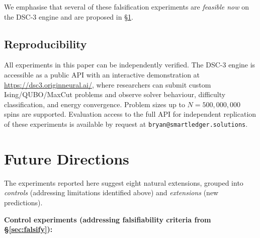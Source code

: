 \documentclass[11pt,a4paper]{article}
\begin{document}
\noindent We emphasise that several of these falsification experiments are \emph{feasible now} on the DSC-3 engine and are proposed in \S\ref{sec:future}.

\subsection{Reproducibility}\label{sec:repro}

All experiments in this paper can be independently verified.
The DSC-3 engine is accessible as a public API with an interactive demonstration at \url{https://dsc3.originneural.ai/}, where researchers can submit custom Ising/QUBO/MaxCut problems and observe solver behaviour, difficulty classification, and energy convergence.
Problem sizes up to $N = 500{,}000{,}000$ spins are supported.
Evaluation access to the full API for independent replication of these experiments is available by request at \texttt{bryan@smartledger.solutions}.


\section{Future Directions}\label{sec:future}

The experiments reported here suggest eight natural extensions, grouped into \emph{controls} (addressing limitations identified above) and \emph{extensions} (new predictions).

\medskip\noindent\textbf{Control experiments (addressing falsifiability criteria from \S\ref{sec:falsify}):}
\end{document}
